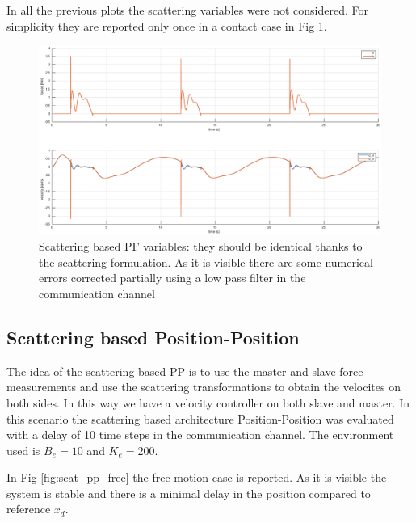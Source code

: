 \documentclass[a4paper,12pt]{article}
\begin{document}
In all the previous plots the scattering variables were not considered. For simplicity they are reported only once in a contact case in Fig \ref{fig:scat_var}.
\begin{figure}[H]
    \begin{center}
        \hspace*{-4.5cm}
        \includegraphics[scale=0.5]{images/scatt_pf.eps}
    \end{center}
    \caption{Scattering based PF variables: they should be identical thanks to the scattering formulation. As it is visible there are some numerical errors corrected partially using a low pass filter in the communication channel}
    \label{fig:scat_var}
\end{figure}

\newpage

\subsection{Scattering based Position-Position}

The idea of the scattering based PP is to use the master and slave force measurements and use the scattering transformations to obtain the velocites on both sides. In this way we have a velocity controller on both slave and master. In this scenario the scattering based architecture Position-Position was evaluated with a delay of 10 time steps in the communication channel. The environment used is $B_e = 10$ and $K_e = 200$. 

\bigskip
In Fig \ref{fig:scat_pp_free} the free motion case is reported. As it is visible the system is stable and there is a minimal delay in the position compared to reference $x_d$.
\end{document}
